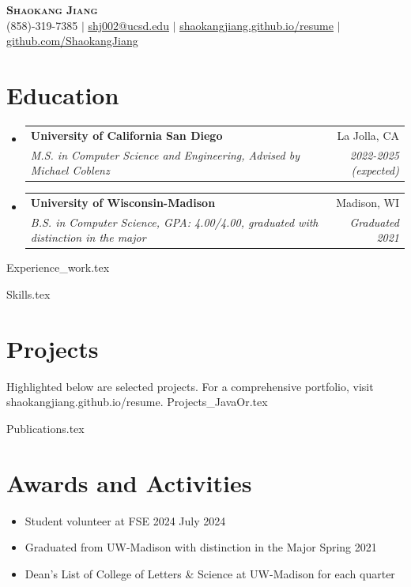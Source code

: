\documentclass[letterpaper,11pt]{article}
\makeatletter
\newcommand{\resumeItem}[1]{
  \item\small{
    {#1 \vspace{-2pt}}
  }
}
\newcommand{\resumeSubheading}[4]{
  \vspace{-2pt}\item
    \begin{tabular*}{0.97\textwidth}[t]{l@{\extracolsep{\fill}}r}
      \textbf{#1} & #2 \\
      \textit{\small#3} & \textit{\small #4} \\
    \end{tabular*}\vspace{-7pt}
}
\newcommand{\resumeSubHeadingListStart}{\begin{itemize}[leftmargin=0.12in, label={}]}
\newcommand{\resumeSubHeadingListEnd}{\end{itemize}}
\newcommand{\resumeItemListStart}{\begin{itemize}}
\newcommand{\resumeItemListEnd}{\end{itemize}\vspace{-5pt}}
\makeatother
\begin{document}

\begin{center}
    \textbf{\Huge \scshape Shaokang Jiang} \\ \vspace{1pt}
    \small (858)-319-7385 $|$ \href{mailto:shj002@ucsd.edu}{\underline{shj002@ucsd.edu}} $|$ 
    \href{https://shaokangjiang.github.io/resume}{\underline{shaokangjiang.github.io/resume}} $|$
    \href{https://github.com/ShaokangJiang}{\underline{github.com/ShaokangJiang}}
\end{center}


\section{Education}
  \resumeSubHeadingListStart
    \resumeSubheading
      {University of California San Diego}{La Jolla, CA}
      {M.S. in Computer Science and Engineering, Advised by Michael Coblenz}{2022-2025 (expected)}
    \resumeSubheading
      {University of Wisconsin-Madison}{Madison, WI}
      {B.S. in Computer Science, GPA: 4.00/4.00, graduated with distinction in the major}{Graduated 2021}
  \resumeSubHeadingListEnd


  
{Experience_work.tex}

%
{Skills.tex}


\section{Projects}

Highlighted below are selected projects. For a comprehensive portfolio, visit shaokangjiang.github.io/resume.
\vspace{0.5em}
{Projects_JavaOr.tex}




% 
{Publications.tex}


\section{Awards and Activities}

\resumeItemListStart
\resumeItem{Student volunteer at FSE 2024 \hfill July 2024}
\resumeItem{Graduated from UW-Madison with distinction in the Major \hfill Spring 2021}
\resumeItem{Dean's List of College of Letters \& Science at UW-Madison for each quarter}
\resumeItemListEnd


\end{document}
